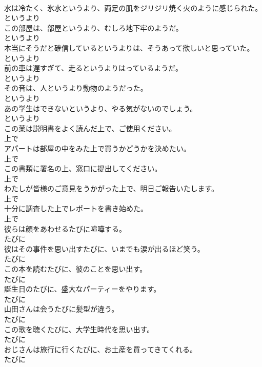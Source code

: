 \documentclass[8pt]{extreport}
\begin{document}
\begin{CJK}{UTF8}{min}
\\	水は冷たく、氷水というより、両足の肌をジリジリ焼く火のように感じられた。	
\\	というより
\\	この部屋は、部屋というより、むしろ地下牢のようだ。	
\\	というより
\\	本当にそうだと確信しているというよりは、そうあって欲しいと思っていた。	
\\	というより
\\	前の車は遅すぎて、走るというよりはっているようだ。	
\\	というより
\\	その音は、人というより動物のようだった。	
\\	というより
\\	あの学生はできないというより、やる気がないのでしょう。	
\\	というより
\\	この薬は説明書をよく読んだ上で、ご使用ください。	
\\	上で
\\	アパートは部屋の中をみた上で買うかどうかを決めたい。	
\\	上で
\\	この書類に署名の上、窓口に提出してください。	
\\	上で
\\	わたしが皆様のご意見をうかがった上で、明日ご報告いたします。	
\\	上で
\\	十分に調査した上でレポートを書き始めた。	
\\	上で
\\	彼らは顔をあわせるたびに喧嘩する。	
\\	たびに
\\	彼はその事件を思い出すたびに、いまでも涙が出るほど笑う。	
\\	たびに
\\	この本を読むたびに、彼のことを思い出す。	
\\	たびに
\\	誕生日のたびに、盛大なパーティーをやります。	
\\	たびに
\\	山田さんは会うたびに髪型が違う。	
\\	たびに
\\	この歌を聴くたびに、大学生時代を思い出す。	
\\	たびに
\\	おじさんは旅行に行くたびに、お土産を買ってきてくれる。	
\\	たびに

\end{CJK}
\end{document}
